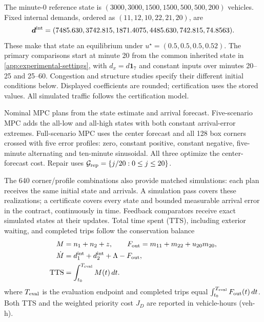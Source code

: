 \documentclass[preprint,12pt]{elsarticle}
\theoremstyle{definition}
\theoremstyle{plain}
\theoremstyle{definition}
\theoremstyle{plain}
\newcommand{\appref}[1]{\ref{#1}}
\begin{document}
The minute-0 reference state is $(3000,3000,1500,1500,500,500,200)$
vehicles. Fixed internal demands, ordered as $(11,12,10,22,21,20)$, are
\begin{equation}
\boldsymbol d^{\rm int}=(7485.630,3742.815,1871.4075,
                        4485.630,742.815,74.8563).
\label{eq:new-incident-demands}
\end{equation}
These make that state an equilibrium under
$u^\star=(0.5,0.5,0.5,0.52)$. The primary comparisons start at minute 20
from the common inherited state in \appref{app:experimental-settings},
with $d_x=d\mathbf1_7$ and constant inputs over minutes 20--25 and
25--60. Congestion and structure studies specify their different initial
conditions below. Displayed coefficients are rounded; certification uses
the stored values. All simulated traffic follows the certification model.

Nominal MPC plans from the state estimate and arrival forecast.
Five-scenario MPC adds the all-low and all-high states with both constant
arrival-error extremes. Full-scenario MPC uses the center forecast and
all 128 box corners crossed with five error profiles: zero, constant
positive, constant negative, five-minute alternating and ten-minute
sinusoidal. All three optimize the center-forecast cost. Repair uses
$\mathcal G_{\rm rep}=\{j/20:0\le j\le20\}$.

The 640 corner/profile combinations also provide matched simulations:
each plan receives the same initial state and arrivals. A simulation
pass covers these realizations; a certificate covers every state and
bounded measurable arrival error in the contract, continuously in time.
Feedback comparators receive exact simulated states at their updates.
Total time spent (TTS), including exterior waiting, and completed trips
follow the conservation balance
\begin{equation}
\begin{aligned}
M&=n_1+n_2+z,\qquad F_{\rm out}=m_{11}+m_{22}+u_{20}m_{20},\\
\dot M&=d_1^{\rm int}+d_2^{\rm int}+\Lambda-F_{\rm out},\\
\mathrm{TTS}&=\int_{t_0}^{T_{\rm eval}}M(t)\,dt.
\end{aligned}
\label{eq:new-conservation}
\end{equation}
where $T_{\rm eval}$ is the evaluation endpoint and completed trips equal
$\int_{t_0}^{T_{\rm eval}}F_{\rm out}(t)\,dt$. Both TTS and the weighted
priority cost $J_D$ are reported in vehicle-hours (veh-h).
\end{document}
